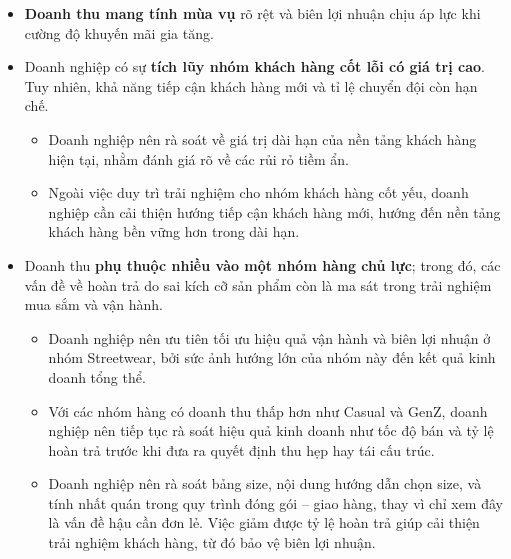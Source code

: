 \documentclass{article}
\begin{document}
\begin{itemize}
    \item\textbf{Doanh thu mang tính mùa vụ} rõ rệt và biên lợi nhuận chịu áp lực
        khi cường độ khuyến mãi gia tăng.
    \item Doanh nghiệp có sự \textbf{tích lũy nhóm khách hàng cốt lỗi có giá trị cao}.
        Tuy nhiên, khả năng tiếp cận khách hàng mới và tỉ lệ chuyển đội còn hạn chế.
    \begin{itemize}
        \item Doanh nghiệp nên rà soát về giá trị dài hạn của nền tảng khách hàng
            hiện tại, nhằm đánh giá rõ về các rủi rỏ tiềm ẩn.
        \item Ngoài việc duy trì trải nghiệm cho nhóm khách hàng cốt yếu, doanh
            nghiệp cần cải thiện hướng tiếp cận khách hàng mới, hướng đến nền
            tảng khách hàng bền vững hơn trong dài hạn.
    \end{itemize}
    \item Doanh thu \textbf{phụ thuộc nhiều vào một nhóm hàng chủ lực}; trong đó,
        các vấn đề về hoàn trả do sai kích cỡ sản phẩm còn là ma sát trong trải
        nghiệm mua sắm và vận hành.
    \begin{itemize}
        \item Doanh nghiệp nên ưu tiên tối ưu hiệu quả vận hành và biên lợi nhuận
            ở nhóm Streetwear, bởi sức ảnh hướng lớn của nhóm này đến kết quả
            kinh doanh tổng thể.
        \item Với các nhóm hàng có doanh thu thấp hơn như Casual và GenZ, doanh
            nghiệp nên tiếp tục rà soát hiệu quả kinh doanh như tốc độ bán và tỷ
            lệ hoàn trả trước khi đưa ra quyết định thu hẹp hay tái cấu trúc.
        \item Doanh nghiệp nên rà soát bảng size, nội dung hướng dẫn chọn size,
            và tính nhất quán trong quy trình đóng gói -- giao hàng, thay vì chỉ
            xem đây là vấn đề hậu cần đơn lẻ. Việc giảm được tỷ lệ hoàn trả giúp
            cải thiện trải nghiệm khách hàng, từ đó bảo vệ biên lợi nhuận.
    \end{itemize}
\end{itemize}

\end{document}
